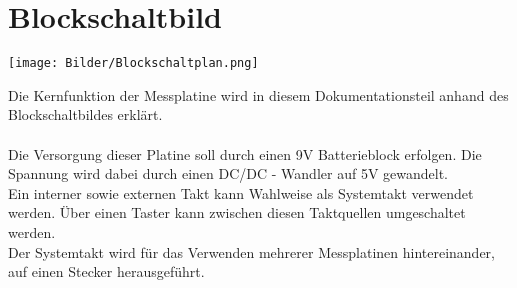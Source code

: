 \documentclass[a4paper,11pt]{scrartcl}
\begin{document}
\section{Blockschaltbild}
	
\begin{center}
\texttt{[image: Bilder/Blockschaltplan.png]}
\end{center}

\newpage

Die Kernfunktion der Messplatine wird in diesem Dokumentationsteil anhand des Blockschaltbildes erklärt. 
\\
\\
Die Versorgung dieser Platine soll durch einen 9V Batterieblock erfolgen. Die Spannung wird dabei durch einen DC/DC - Wandler auf 5V gewandelt.
\\
Ein interner sowie externen Takt kann Wahlweise als Systemtakt verwendet werden. Über einen Taster kann zwischen diesen Taktquellen umgeschaltet werden.
\\
Der Systemtakt wird für das Verwenden mehrerer Messplatinen hintereinander, auf einen Stecker herausgeführt.
\\
\end{document}

